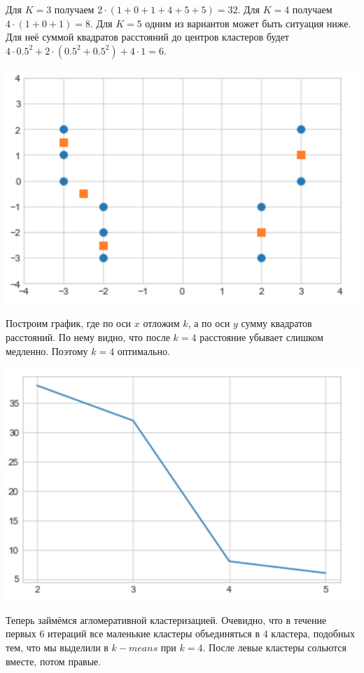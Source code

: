 \documentclass[12pt, a4paper, oneside]{article}
\begin{document}
{ Для $K=3$ получаем $2 \cdot (1 + 0 + 1 + 4  + 5 + 5) = 32$. Для $K=4$ получаем $4 \cdot (1 + 0 + 1 ) = 8$. Для $K=5$ одним из вариантов может быть ситуация ниже. Для неё суммой квадратов расстояний до центров кластеров будет  $4 \cdot 0.5^2 + 2 \cdot(0.5^2 + 0.5^2) + 4 \cdot 1  = 6$. 
 
 \begin{center}
 	\includegraphics[scale=0.3]{k_means_c5.png}
 \end{center}
 
Построим график, где по оси $x$ отложим $k$, а по оси $y$ сумму квадратов расстояний.  По нему видно, что после $k=4$ расстояние убывает слишком медленно. Поэтому $k=4$ оптимально.
 \begin{center}
	\includegraphics[scale=0.3]{optimal_k.png}
\end{center}

Теперь займёмся агломеративной кластеризацией. Очевидно, что в течение первых $6$ итераций все маленькие кластеры объединяться в $4$ кластера, подобных тем, что мы выделили в $k-means$ при $k=4$. После левые кластеры сольются вместе, потом правые.

}
\end{document}
